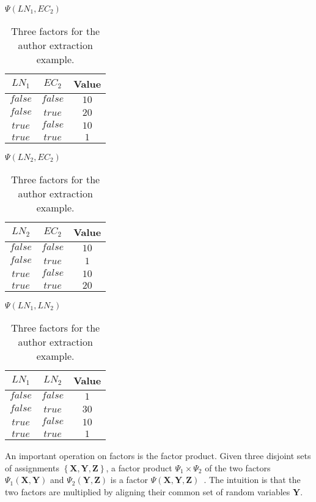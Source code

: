 \begin{table}[t]
\begin{minipage}{0.5\linewidth}
\centering
$\Psi(LN_1,EC_2)$\par
\smallskip
\begin{tabular}{c c c}
 \toprule
 $LN_1$ & $EC_2$ & Value \\
 \midrule
 $\mathit{false}$ & $\mathit{false}$ & $10$ \\
 $\mathit{false}$ & $\mathit{true}$ & $20$ \\
 $\mathit{true}$ & $\mathit{false}$ & $10$ \\
 $\mathit{true}$ & $\mathit{true}$ & $1$ \\
 \bottomrule
\end{tabular}
\end{minipage}
\hfill
\begin{minipage}{0.5\linewidth}
\centering
$\Psi(LN_2,EC_2)$\par
\smallskip
\begin{tabular}{c c c}
 \toprule
 $LN_2$ & $EC_2$ & Value \\
 \midrule
 $\mathit{false}$ & $\mathit{false}$ & $10$ \\
 $\mathit{false}$ & $\mathit{true}$ & $1$ \\
 $\mathit{true}$ & $\mathit{false}$ & $10$ \\
 $\mathit{true}$ & $\mathit{true}$ & $20$ \\
 \bottomrule
\end{tabular}
\end{minipage}
\medskip
\begin{center}
$\Psi(LN_1,LN_2)$\par
\smallskip
\begin{tabular}{c c c}
 \toprule
 $LN_1$ & $LN_2$ & Value \\
 \midrule
 $\mathit{false}$ & $\mathit{false}$ & $1$ \\
 $\mathit{false}$ & $\mathit{true}$ & $30$ \\
 $\mathit{true}$ & $\mathit{false}$ & $10$ \\
 $\mathit{true}$ & $\mathit{true}$ & $1$ \\
 \bottomrule
\end{tabular}
\end{center}
\caption{Three factors for the author extraction example.}
\label{tab:example-factors}
\end{table}

\bigskip

An important operation on factors is the \gls{factor product}.
Given three disjoint sets of \glspl{assignment} $\left\{\mathbf{X}, \mathbf{Y}, \mathbf{Z}\right\}$, a \gls{factor product} $\Psi_1\times\Psi_2$ of the two factors $\Psi_1(\mathbf{X},\mathbf{Y})$ and $\Psi_2(\mathbf{Y},\mathbf{Z})$ is a factor $\Psi(\mathbf{X},\mathbf{Y},\mathbf{Z})$~\citep{koller2009probabilistic}.
The intuition is that the two factors are multiplied by aligning their common set of \glspl{random variable} $\mathbf{Y}$.

